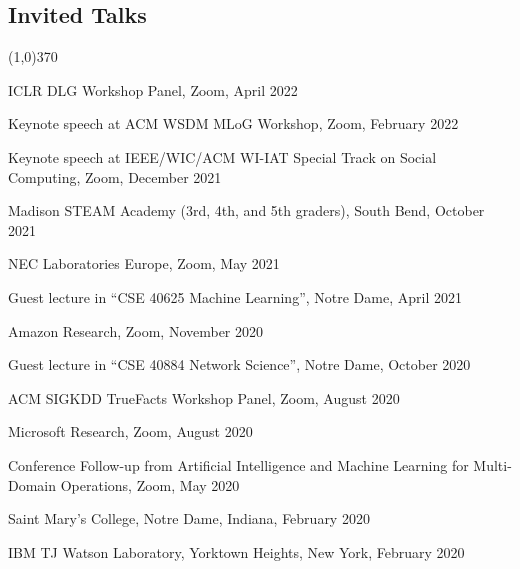 \documentclass[10pt]{article}
\newenvironment{myindentpar}[1]%
{\begin{list}{}%
         {\setlength{\leftmargin}{#1}}%
         \item[]%
}
{\end{list}}
\newcounter{list}
\begin{document}
\subsection{\sc Invited Talks}
\vspace{-0.4cm} \line(1,0){370} \vspace{-0.1cm}

\begin{myindentpar}{0.75cm}

\hspace{-0.75cm} ICLR DLG Workshop Panel, Zoom, April 2022
	
\hspace{-0.75cm} Keynote speech at ACM WSDM MLoG Workshop, Zoom, February 2022
	
\hspace{-0.75cm} Keynote speech at IEEE/WIC/ACM WI-IAT Special Track on Social Computing, Zoom, December 2021

	
\hspace{-0.75cm} Madison STEAM Academy (3rd, 4th, and 5th graders), South Bend, October 2021
	
\hspace{-0.75cm} NEC Laboratories Europe, Zoom, May 2021
	
\hspace{-0.75cm} Guest lecture in ``CSE 40625 Machine Learning'', Notre Dame, April 2021
	
\hspace{-0.75cm} Amazon Research, Zoom, November 2020

\hspace{-0.75cm} Guest lecture in ``CSE 40884 Network Science'', Notre Dame, October 2020

\hspace{-0.75cm} ACM SIGKDD TrueFacts Workshop Panel, Zoom, August 2020
	
\hspace{-0.75cm} Microsoft Research, Zoom, August 2020
	
\hspace{-0.75cm} Conference Follow-up from Artificial Intelligence and Machine Learning for Multi-Domain Operations, Zoom, May 2020
	
\hspace{-0.75cm} Saint Mary's College, Notre Dame, Indiana, February 2020
	
\hspace{-0.75cm} IBM TJ Watson Laboratory, Yorktown Heights, New York, February 2020
	

\end{myindentpar}
\end{document}
